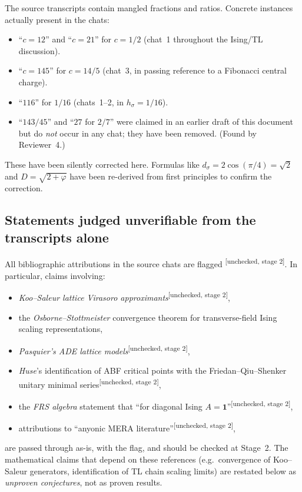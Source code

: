 \documentclass[11pt,a4paper]{article}
\theoremstyle{definition}
\newcommand{\one}{\mathbf{1}}
\newcommand{\unchecked}{\textsuperscript{\textcolor{red!70!black}{[unchecked, stage 2]}}}
\begin{document}
The source transcripts contain mangled fractions and ratios. Concrete
instances actually present in the chats:
\begin{itemize}
\item ``$c=12$'' and ``$c=21$'' for $c=1/2$ (chat~1 throughout the
      Ising/TL discussion).
\item ``$c=145$'' for $c=14/5$ (chat~3, in passing reference to a Fibonacci
      central charge).
\item ``$116$'' for $1/16$ (chats~1--2, in $h_\sigma = 1/16$).
\item ``$143/45$'' and ``$27$ for $2/7$'' were claimed in an earlier draft
      of this document but do \emph{not} occur in any chat; they have been
      removed. (Found by Reviewer~4.)
\end{itemize}
These
have been silently corrected here. Formulas like
$d_\sigma=2\cos(\pi/4)=\sqrt 2$ and $D=\sqrt{2+\varphi}$ have been
re-derived from first principles to confirm the correction.

\subsection{Statements judged unverifiable from the transcripts alone}

All bibliographic attributions in the source chats are flagged
\unchecked. In particular, claims involving:
\begin{itemize}
\item \emph{Koo--Saleur lattice Virasoro approximants}\unchecked,
\item the \emph{Osborne--Stottmeister} convergence theorem for transverse-field
      Ising scaling representations\cite{SRC-OAR-FERMIONS,SRC-OAR-WAVELETS,SRC-OSBORNE-CONTINUUM},
\item \emph{Pasquier's ADE lattice models}\unchecked,
\item \emph{Huse}'s identification of ABF critical points with the
      Friedan--Qiu--Shenker unitary minimal series\unchecked,
\item the \emph{FRS algebra} statement that ``for diagonal Ising
      $A = \one$''\unchecked,
\item attributions to ``anyonic MERA literature''\unchecked,
\end{itemize}
are passed through as-is, with the flag, and should be checked at Stage~2.
The mathematical claims that depend on these references (e.g.\ convergence
of Koo--Saleur generators, identification of TL chain scaling limits) are
restated below as \emph{unproven conjectures}, not as proven results.
\end{document}
